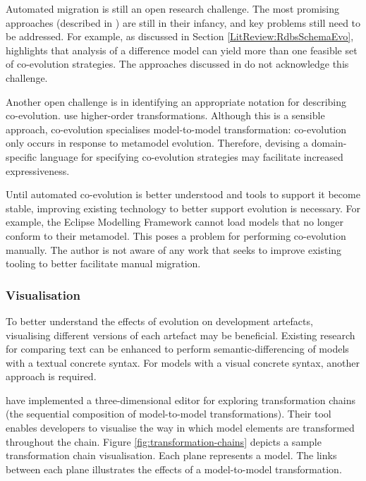 Automated migration is still an open research challenge. The most promising approaches (described in \cite{wachsmuth07metamodel,cicchetti08automating}) are still in their infancy, and key problems still need to be addressed. For example, as discussed in Section \ref{LitReview:RdbsSchemaEvo}, \cite{lerner00model} highlights that analysis of a difference model can yield more than one feasible set of co-evolution strategies. The approaches discussed in \cite{wachsmuth07metamodel,cicchetti08automating} do not acknowledge this challenge.

Another open challenge is in identifying an appropriate notation for describing co-evolution.  \cite{wachsmuth07metamodel,cicchetti08automating} use higher-order transformations. Although this is a sensible approach, co-evolution specialises model-to-model transformation: co-evolution only occurs in response to metamodel evolution. Therefore, devising a domain-specific language for specifying co-evolution strategies may facilitate increased expressiveness.

Until automated co-evolution is better understood and tools to support it become stable, improving existing technology to better support evolution is necessary. For example, the Eclipse Modelling Framework \cite{emf} cannot load models that no longer conform to their metamodel. This poses a problem for performing co-evolution manually. The author is not aware of any work that seeks to improve existing tooling to better facilitate manual migration.


\subsubsection{Visualisation}
To better understand the effects of evolution on development artefacts, visualising different versions of each artefact may be beneficial. Existing research for comparing text can be enhanced to perform semantic-differencing of models with a textual concrete syntax. For models with a visual concrete syntax, another approach is required. 

\cite{pilgrim08constructing} have implemented a three-dimensional editor for exploring transformation chains (the sequential composition of model-to-model transformations). Their tool enables developers to visualise the way in which model elements are transformed throughout the chain. Figure \ref{fig:transformation-chains} depicts a sample transformation chain visualisation. Each plane represents a model. The links between each plane illustrates the effects of a model-to-model transformation.

